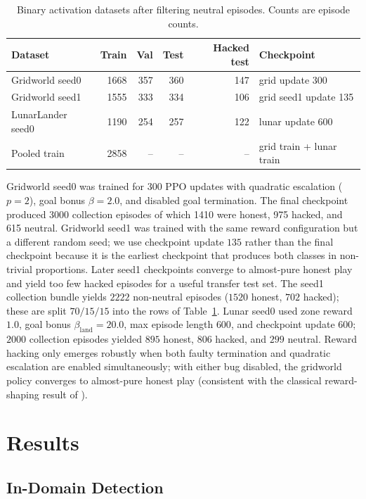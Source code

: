 \documentclass[11pt]{article}
\begin{document}
\begin{table}[H]
\centering
\caption{Binary activation datasets after filtering neutral episodes. Counts are episode counts.}
\label{tab:datasets}
\small
\begin{tabular}{lrrrrl}
\toprule
Dataset & Train & Val & Test & Hacked test & Checkpoint \\
\midrule
Gridworld seed0 & 1668 & 357 & 360 & 147 & grid update 300\\
Gridworld seed1 & 1555 & 333 & 334 & 106 & grid seed1 update 135\\
LunarLander seed0 & 1190 & 254 & 257 & 122 & lunar update 600\\
Pooled train & 2858 & -- & -- & -- & grid train + lunar train\\
\bottomrule
\end{tabular}
\end{table}

Gridworld seed0 was trained for 300 PPO updates with quadratic escalation ($p=2$), goal bonus $\beta=2.0$, and disabled goal termination. The final checkpoint produced 3000 collection episodes of which 1410 were honest, 975 hacked, and 615 neutral. Gridworld seed1 was trained with the same reward configuration but a different random seed; we use checkpoint update $135$ rather than the final checkpoint because it is the earliest checkpoint that produces both classes in non-trivial proportions. Later seed1 checkpoints converge to almost-pure honest play and yield too few hacked episodes for a useful transfer test set. The seed1 collection bundle yields $2222$ non-neutral episodes ($1520$ honest, $702$ hacked); these are split $70/15/15$ into the rows of Table~\ref{tab:datasets}. Lunar seed0 used zone reward $1.0$, goal bonus $\beta_{\text{land}}=20.0$, max episode length $600$, and checkpoint update $600$; $2000$ collection episodes yielded $895$ honest, $806$ hacked, and $299$ neutral. Reward hacking only emerges robustly when both faulty termination and quadratic escalation are enabled simultaneously; with either bug disabled, the gridworld policy converges to almost-pure honest play (consistent with the classical reward-shaping result of \cite{ng1999shaping}).

\section{Results}

\subsection{In-Domain Detection}
\end{document}
